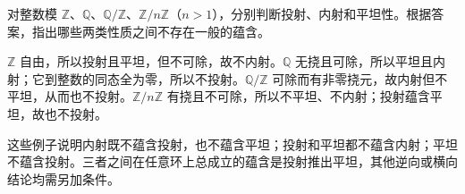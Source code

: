 \begin{exercise}\label{b2:ex:07-compare-three-classes}
	对整数模 \(\mathbb Z\)、\(\mathbb Q\)、\(\mathbb Q/\mathbb Z\)、\(\mathbb Z/n\mathbb Z\)（\(n>1\)），分别判断投射、内射和平坦性。根据答案，指出哪些两类性质之间不存在一般的蕴含。
\end{exercise}
\begin{solution}
	\(\mathbb Z\) 自由，所以投射且平坦，但不可除，故不内射。\(\mathbb Q\) 无挠且可除，所以平坦且内射；它到整数的同态全为零，所以不投射。\(\mathbb Q/\mathbb Z\) 可除而有非零挠元，故内射但不平坦，从而也不投射。\(\mathbb Z/n\mathbb Z\) 有挠且不可除，所以不平坦、不内射；投射蕴含平坦，故也不投射。

	这些例子说明内射既不蕴含投射，也不蕴含平坦；投射和平坦都不蕴含内射；平坦不蕴含投射。三者之间在任意环上总成立的蕴含是投射推出平坦，其他逆向或横向结论均需另加条件。
\end{solution}
